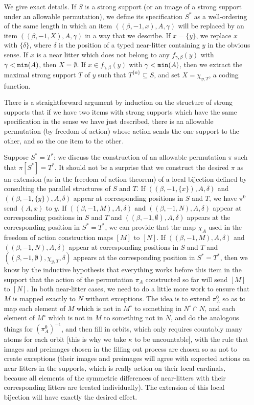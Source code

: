 \documentclass[112pt]{article}
\begin{document}
We give exact details.  If $S$ is a strong support (or an image of a strong support under an allowable permutation), we define
its specification $S^*$ as a well-ordering of the same length in which an item $((\beta,-1,x),A,\gamma)$ will be replaced by an item 
$((\beta,-1,X),A,\gamma)$ in a way that we describe.  If $x=\{y\}$, we replace $x$ with $\{\delta\}$, where $\delta$ is the position of a typed near-litter containing $y$ in the obvious sense.  If $x$ is a near litter which does not belong to any $f_{\gamma,\beta}(y)$ with $\gamma<{\tt min}(A)$, then 
$X= \emptyset$.  If $x \in f_{\gamma,\beta}(y)$ with $\gamma<{\tt min}(A)$, then we extract the maximal strong support $T$ of $y$ such that
$T^{\{\alpha\}} \subseteq S$, and set $X = \chi_{y,T}$, a coding function.

There is a straightforward argument by induction on the structure of strong supports that if we have two items with strong supports which have the same specification in the sense we have just described, there is an allowable permutation (by freedom of action) whose action sends the one support to the other, and so the one item to the other.

Suppose $S^* = T^*$:  we discuss the construction of an allowable permutation $\pi$ such that $\pi[S^*]=T^*$.  It should not be a surprise
that we construct the desired $\pi$ as an extension (as in the freedom of action theorem) of a local bijection defined by consulting the parallel structures of $S$ and $T$.  If $((\beta,-1,\{x\}),A,\delta)$ and $((\beta,-1,\{y\}),A,\delta)$ appear at corresponding positions in $S$ and $T$, we have $\pi^0$ send
$(A,x)$ to $y$.  If $((\beta,-1,M),A,\delta)$ and $((\beta,-1,N),A,\delta)$ appear at corresponding positions in $S$ and $T$ and $((\beta,-1,\emptyset),A,\delta)$ appears at the corresponding position in $S^*=T^*$, we can provide that the map $\chi_A$ used in the freedom of action construction
maps $[M]$ to $[N]$.  If $((\beta,-1,M),A,\delta)$ and $((\beta,-1,N),A,\delta)$ appear at corresponding positions in $S$ and $T$ and $((\beta,-1,\emptyset),\chi_{y,T},\delta)$ appears at the corresponding position in $S^*=T^*$,  then we know by the inductive hypothesis that everything works before this item in the support that the action of the permutation $\pi_A$ constructed so far will send $[M]$ to $[N]$.  In both near-litter cases, we need to do a little more work to ensure that $M$ is mapped exactly to $N$ without exceptions.  The idea is to extend $\pi^0_A$ so as to map each element of
$M$ which is not in $M^\circ$ to something in $N^\circ \cap N$, and each element of $M^\circ$ which is not in $M$ to something not in $N$, and do the analogous things for $(\pi^0_A)^{-1}$, and then fill in orbits, which only requires countably many atoms for each orbit [this is why we take $\kappa$ to be uncountable], with the rule that images and preimages chosen in the filling out process are chosen so as not to create exceptions (their images and preimages will agree with expected actions on near-litters in the supports, which is really action on their local cardinals, because all elements of the symmetric differences of near-litters with their corresponding litters are treated individually).  The extension of this local bijection will have exactly the desired effect.
\end{document}
